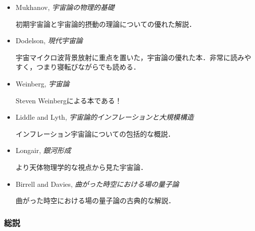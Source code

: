 \begin{itemize}
\item Mukhanov, {\it 宇宙論の物理的基礎}

初期宇宙論と宇宙論的摂動の理論についての優れた解説．

\item Dodelson, {\it 現代宇宙論}

宇宙マイクロ波背景放射に重点を置いた，宇宙論の優れた本．非常に読みやすく，つまり寝転びながらでも読める．


\item Weinberg, {\it 宇宙論}

Steven Weinbergによる本である！

\item Liddle and Lyth, {\it 宇宙論的インフレーションと大規模構造}

インフレーション宇宙論についての包括的な概説．

\item Longair, {\it 銀河形成}

より天体物理学的な視点から見た宇宙論．

\item Birrell and Davies, {\it 曲がった時空における場の量子論}

曲がった時空における場の量子論の古典的な解説．


\end{itemize}


\subsubsection*{総説}

